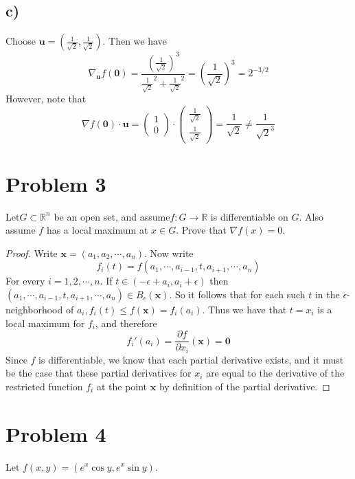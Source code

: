 \documentclass{article}
\theoremstyle{definition}
\begin{document}
\subsection*{c)}
Choose $\bm u = (\frac{1}{\sqrt{2}}, \frac{1}{\sqrt{2}})$. Then we have
\[
    \nabla_{\bm u}f(\bm 0) = \frac{\left(\frac{1}{\sqrt{2}}\right)^3}{\frac{1}{\sqrt{2}}^2 + \frac{1}{\sqrt{2}}^2} = \left(\frac{1}{\sqrt{2}}\right)^3 = 2^{-3/2}
\]
However, note that 
\[
    \nabla f (\bm 0 ) \cdot \bm u = \begin{pmatrix}
        1 \\ 0
    \end{pmatrix} \cdot \begin{pmatrix}
        \frac{1}{\sqrt{2}} \\ \frac{1}{\sqrt{2}}
    \end{pmatrix} = \frac{1}{\sqrt{2}} \neq \frac{1}{\sqrt{2}^3}
\]
\section*{Problem 3}
\begin{mdframed}[]
    Let$G \subset \mathbb{R}^n$ be  an  open  set,  and  assume$f:G\rightarrow \mathbb{R}$ is  differentiable  on $G$.
    Also assume $f$ has a local maximum at $x\in G$. Prove that $\nabla f(x) =0$.
\end{mdframed}
\begin{proof}
    Write $\bm x = (a_1,a_2,\cdots,a_n)$. Now write 
    \[
        f_i(t) = f(a_1,\cdots,a_{i-1},t,a_{i+1},\cdots,a_n)
    \]
    For every $i = 1,2,\cdots,n$. If $t \in (-\epsilon + a_i, a_i + \epsilon)$
    then $(a_1,\cdots,a_{i-1},t,a_{i+1},\cdots,a_n) \in B_\epsilon(\bm x)$. So it follows that 
    for each such $t$ in the $\epsilon$-neighborhood of $a_i, f_i(t) \leqslant f(\bm x) = f_i(a_i)$. Thus we have that $t = x_i$
    is a local maximum for $f_i$, and therefore \[f_i'(a_i) = \frac{\partial f}{\partial x_i}(\bm x) = \bm 0\]
    Since $f$ is differentiable, we know that each partial derivative exists, and it must be the case 
    that these partial derivatives for $x_i$ are equal to the derivative of the restricted function $f_i$ at the point $\bm x$
    by definition of the partial derivative.
\end{proof}
\section*{Problem 4}
Let $f(x,y) = (e^x \cos y, e^x \sin y)$. 
\end{document}

